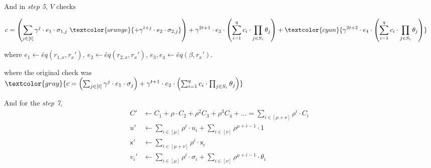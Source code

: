 \documentclass{beamer}
\begin{document}
\begin{tiny}
\begin{frame}

\end{frame}

\begin{frame}
  And in \emph{step 5}, $V$ checks

\begin{align*}
	c &= \left(\sum_{j \in [t]} \gamma^j \cdot e_1 \cdot \sigma_{1,j}
~\textcolor{orange}{+ \gamma^{t+j} \cdot e_2 \cdot \sigma_{2,j}}\right)
	  + \gamma^{2t+1} \cdot e_3 \cdot \left( \sum_{i=1}^q c_i \cdot \prod_{j \in S_i} \theta_j \right)
	  + \textcolor{cyan}{\gamma^{2t+2} \cdot e_4 \cdot \left( \sum_{i=1}^q c_i \cdot \prod_{j \in S_i} \theta_j \right)} 
\end{align*}

where
$e_1 \leftarrow \widetilde{eq}(r_{1,x}, r_x'),~ e_2 \leftarrow \widetilde{eq}(r_{2,x}, r_x')$, $e_3, e_4 \leftarrow \widetilde{eq}(\beta, r_x')$.

\vspace{0.5cm}


where the original check was\\
$\textcolor{gray}{c = \left(\sum_{j \in [t]} \gamma^j \cdot e_1 \cdot \sigma_j \right) + \gamma^{t+1} \cdot e_2 \cdot \left( \sum_{i=1}^q c_i \cdot \prod_{j \in S_i} \theta_j \right)}$

\end{frame}

\begin{frame}
And for the \emph{step 7},
\begin{align*}
	C' &\leftarrow C_1 + \rho \cdot C_2 + \rho^2 C_3 + \rho^3 C_4 + \ldots = \sum_{i \in [\mu + \nu]} \rho^i \cdot C_i \\
	u' &\leftarrow \sum_{i \in [\mu]} \rho^i \cdot u_i + \sum_{i \in [\nu]} \rho^{\mu + i-1} \cdot 1\\
	\mathsf{x}' &\leftarrow \sum_{i \in [\mu+\nu]} \rho^i \cdot \mathsf{x}_i\\
	v_i' &\leftarrow \sum_{i \in [\mu]} \rho^i \cdot \sigma_i + \sum_{i \in [\nu]} \rho^{\mu + i-1} \cdot \theta_i\\
\end{align*}


\end{frame}
\end{tiny}
\end{document}
